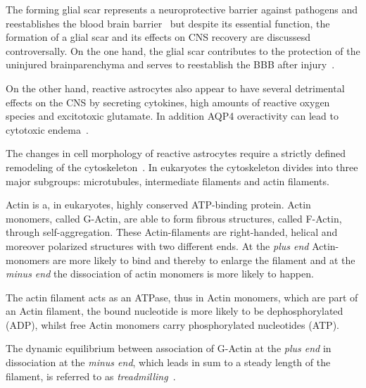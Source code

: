 \documentclass[a4paper,11pt,bibtotocnumbered]{article}
\begin{document}

 The forming glial scar represents a neuroprotective barrier against pathogens and reestablishes the blood brain barrier~\cite{Sofroniew2010} but despite its essential function, the formation of a glial scar and its effects on CNS recovery are discussesd controversally.
On the one hand, the glial scar contributes to the protection of the uninjured brainparenchyma and serves to reestablish the BBB after injury~\cite{Liddelow2017}.


On the other hand, reactive astrocytes also appear to have several detrimental effects on the CNS by secreting cytokines, high amounts of reactive oxygen species and excitotoxic glutamate. In addition AQP4 overactivity can lead to cytotoxic endema~\cite{Sofroniew2010}.



The changes in cell morphology of reactive astrocytes require a strictly defined remodeling of the cytoskeleton~\cite{Zamanian2012}.
In eukaryotes the cytoskeleton divides into three major subgroups: microtubules, intermediate filaments and actin filaments.

Actin is a, in eukaryotes, highly conserved ATP-binding protein. Actin monomers, called G-Actin, are able to form fibrous structures, called F-Actin, through self-aggregation. These Actin-filaments are right-handed, helical and moreover polarized structures with two different ends. At the \textit{plus end} Actin-monomers are more likely to bind and thereby to enlarge the filament and at the \textit{minus end} the dissociation of actin monomers is more likely to happen.

The actin filament acts as an ATPase, thus in Actin monomers, which are part of an Actin filament, the bound nucleotide is more likely to be dephosphorylated (ADP), whilst free Actin monomers carry phosphorylated nucleotides (ATP).      

The dynamic equilibrium between association of G-Actin at the \textit{plus end} in dissociation at the \textit{minus end}, which leads in sum to a steady length of the filament, is referred to as \textit{treadmilling}~\cite{Alberts2015}.
\end{document}
